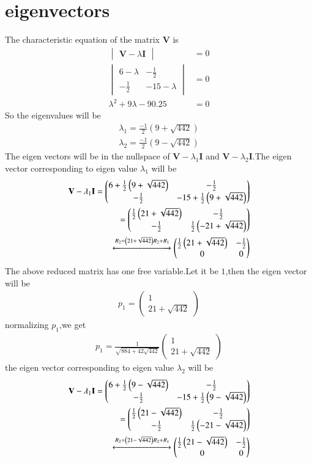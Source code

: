 \documentclass[journal,12pt,twocolumn]{IEEEtran}
\providecommand{\brak}[1]{\ensuremath{\left(#1\right)}}
\newcommand{\myvec}[1]{\ensuremath{\begin{pmatrix}#1\end{pmatrix}}}
\newcommand{\mydet}[1]{\ensuremath{\begin{vmatrix}#1\end{vmatrix}}}
\numberwithin{equation}{subsection}
\let\vec\mathbf
\begin{document}
\section{eigenvectors}
The characteristic equation of the matrix $\vec{V}$ is
\begin{align}
    \mydet{\vec{V}-\lambda\vec{I}}&=0\\
    \mydet{6-\lambda&-\frac{1}{2}\\-\frac{1}{2}&-15-\lambda}&=0\\
    \lambda^2+9\lambda-90.25&=0
\end{align}
So the eigenvalues will be
\begin{align}
    \lambda_1=\frac{-1}{2}\brak{9+\sqrt{442}}\\
    \lambda_2=\frac{-1}{2}\brak{9-\sqrt{442}}
\end{align}
The eigen vectors will be in the nullspace of $\vec{V}-\lambda_1\vec{I}$ and $\vec{V}-\lambda_2\vec{I}$.The eigen vector corresponding to eigen value $\lambda_1$ will be
\begin{align}
    \vec{V}-\lambda_1\vec{I}=\myvec{6+\frac{1}{2}\brak{9+\sqrt{442}}&-\frac{1}{2}\\-\frac{1}{2}&-15+\frac{1}{2}\brak{9+\sqrt{442}}}\\
    =\myvec{\frac{1}{2}\brak{21+\sqrt{442}}&-\frac{1}{2}\\-\frac{1}{2}&\frac{1}{2}\brak{-21+\sqrt{442}}}\\
    \xleftrightarrow[]{R_2=\brak{21+\sqrt{442}}R_2+R_1}\myvec{\frac{1}{2}\brak{21+\sqrt{442}}&-\frac{1}{2}\\0&0}
\end{align}
The above reduced matrix has one free variable.Let it be $1$,then the eigen vector will be
\begin{align}
    {p_1}=\myvec{1\\21+\sqrt{442}}
\end{align}
normalizing $p_1$,we get
\begin{align}
    p_1=\frac{1}{\sqrt{884+42\sqrt{442}}}\myvec{1\\21+\sqrt{442}}
\end{align}
the eigen vector corresponding to eigen value $\lambda_2$ will be
\begin{align}
    \vec{V}-\lambda_1\vec{I}=\myvec{6+\frac{1}{2}\brak{9-\sqrt{442}}&-\frac{1}{2}\\-\frac{1}{2}&-15+\frac{1}{2}\brak{9-\sqrt{442}}}\\
    =\myvec{\frac{1}{2}\brak{21-\sqrt{442}}&-\frac{1}{2}\\-\frac{1}{2}&\frac{1}{2}\brak{-21-\sqrt{442}}}\\
    \xleftrightarrow[]{R_2=\brak{21-\sqrt{442}}R_2+R_1}\myvec{\frac{1}{2}\brak{21-\sqrt{442}}&-\frac{1}{2}\\0&0}
\end{align}
\end{document}
